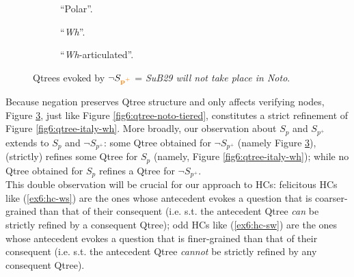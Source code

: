 \begin{figure}[H]
	\centering
	\begin{subfigure}[b]{.2\linewidth}
		\centering
		\caption[]{``Polar''.}\label{fig6:qtree-not-noto-polar}
	\end{subfigure}\hfill
	\begin{subfigure}[b]{.37\linewidth}
		\centering
		\caption[]{``\textit{Wh}''.}\label{fig6:qtree-not-noto-wh}
	\end{subfigure}
	
	\begin{subfigure}[b]{.37\linewidth}
		\centering
		\caption[]{``\textit{Wh}-articulated''.}\label{fig6:qtree-not-noto-tiered}
	\end{subfigure}
	\caption[]{Qtrees evoked by $\neg S_{\textbf{\textcolor{orange}{p$^+$}}}$ = \textit{SuB29 will not take place in Noto}.}\label{fig6:qtrees-not-noto}
\end{figure}

Because negation preserves Qtree structure and only affects verifying nodes, Figure \ref{fig6:qtree-not-noto-tiered}, just like Figure \ref{fig6:qtree-noto-tiered}, constitutes a strict refinement of Figure \ref{fig6:qtree-italy-wh}. More broadly, our observation about $S_p$ and $S_{p^+}$ extends to $S_p$ and $\neg S_{p^+}$: some Qtree obtained for $\neg S_{p^+}$ (namely Figure \ref{fig6:qtree-not-noto-tiered}), (strictly) refines some Qtree for $S_p$ (namely, Figure \ref{fig6:qtree-italy-wh}); while no Qtree obtained for $S_p$ refines a Qtree for $\neg S_{p^+}$.\\

This double observation will be crucial for our approach to HCs: felicitous HCs like (\ref{ex6:hc-ws}) are the ones whose antecedent evokes a question that is coarser-grained than that of their consequent (i.e. s.t. the antecedent Qtree \textit{can} be strictly refined by a consequent Qtree); odd HCs like (\ref{ex6:hc-sw}) are the ones whose antecedent evokes a question that is finer-grained than that of their consequent (i.e. s.t. the antecedent Qtree \textit{cannot} be strictly refined by any consequent Qtree).

